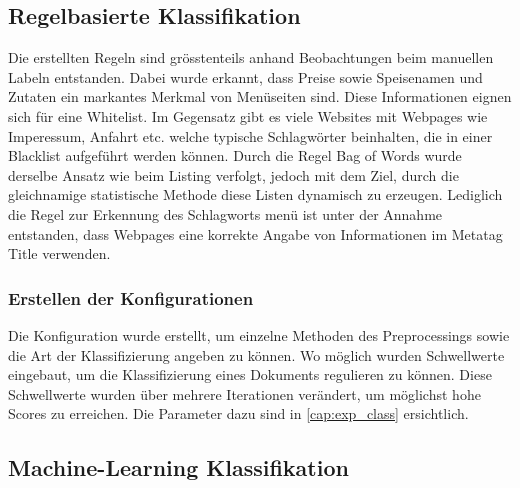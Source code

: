 \subsection{Regelbasierte Klassifikation}
Die erstellten Regeln sind grösstenteils anhand Beobachtungen beim manuellen Labeln entstanden.
Dabei wurde erkannt, dass Preise sowie Speisenamen und Zutaten ein markantes Merkmal von Menüseiten sind.
Diese Informationen eignen sich für eine Whitelist.
Im Gegensatz gibt es viele Websites mit Webpages wie \glqq Imperessum\grqq{}, \glqq Anfahrt\grqq{} etc. welche typische Schlagwörter beinhalten, die in einer Blacklist aufgeführt werden können.
Durch die Regel \glqq Bag of Words\grqq{} wurde derselbe Ansatz wie beim Listing verfolgt, jedoch mit dem Ziel, durch die gleichnamige statistische Methode diese Listen dynamisch zu erzeugen.
Lediglich die Regel zur Erkennung des Schlagworts \glqq menü\grqq{} ist unter der Annahme entstanden, dass Webpages eine korrekte Angabe von Informationen im Metatag \glqq Title\grqq{} verwenden.
\subsubsection{Erstellen der Konfigurationen}
Die Konfiguration wurde erstellt, um einzelne Methoden des Preprocessings sowie die Art der Klassifizierung angeben zu können.
Wo möglich wurden Schwellwerte eingebaut, um die Klassifizierung eines Dokuments regulieren zu können.
Diese Schwellwerte wurden über mehrere Iterationen verändert, um möglichst hohe Scores zu erreichen.
Die Parameter dazu sind in \cref{cap:exp_class} ersichtlich.
\subsection{Machine-Learning Klassifikation}
